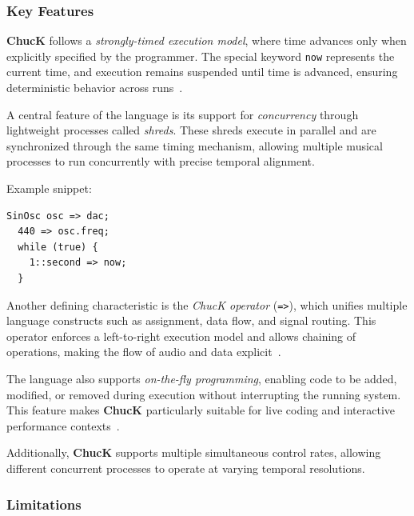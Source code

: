 
\subsubsection{Key Features}

\textbf{ChucK} follows a \textit{strongly-timed execution model}, where time advances only when explicitly specified by
the programmer.
The special keyword \texttt{now} represents the current time, and execution remains suspended until time is advanced,
ensuring deterministic behavior across runs~\cite{Wang_Cook_2003}.

A central feature of the language is its support for \textit{concurrency} through lightweight processes called
\textit{shreds}.
These shreds execute in parallel and are synchronized through the same timing mechanism, allowing multiple musical
processes to run concurrently with precise temporal alignment.

Example snippet:

\begin{lstlisting}[label={detail-lst:chuck-1}]
  SinOsc osc => dac;
  440 => osc.freq;
  while (true) {
    1::second => now;
  }
\end{lstlisting}

Another defining characteristic is the \textit{ChucK operator} (\texttt{=>}), which unifies multiple language constructs
such as assignment, data flow, and signal routing.
This operator enforces a left-to-right execution model and allows chaining of operations, making the flow of audio and
data explicit~\cite{Wang_Cook_2003}.

The language also supports \textit{on-the-fly programming}, enabling code to be added, modified, or removed during
execution without interrupting the running system.
This feature makes \textbf{ChucK} particularly suitable for live coding and interactive performance
contexts~\cite{Wang_Cook_2003}.

Additionally, \textbf{ChucK} supports multiple simultaneous control rates, allowing different concurrent processes to
operate at varying temporal resolutions.


\subsubsection{Limitations}

